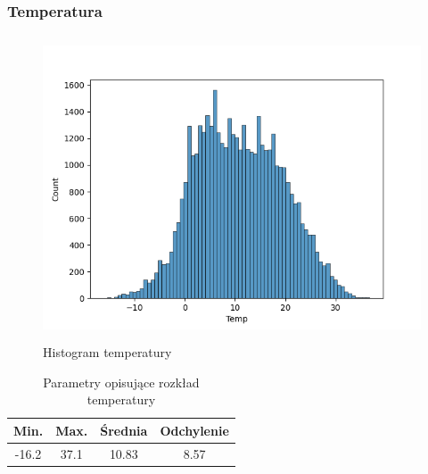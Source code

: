 \documentclass[18pt, letterpaper]{article}
\begin{document}
\subsubsection{Temperatura}
\begin{figure}[H]
\centering
\includegraphics[width=120mm, height=90mm]{visualisations/histograms/Temp_hist.png}
\caption{Histogram temperatury}
\end{figure}
\begin{table}[H]
\centering
\begin{tabular}{|c|c|c|c|}
\hline
Min.  & Max. & Średnia & Odchylenie \\ \hline
-16.2 & 37.1 & 10.83   & 8.57      \\ \hline
\end{tabular}
\caption{Parametry opisujące rozkład temperatury}
\end{table}
\end{document}
